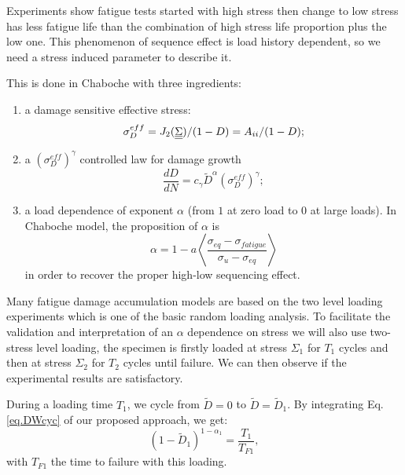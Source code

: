 Experiments show fatigue tests started with high stress then change to low stress has less fatigue life than the combination of high stress life proportion plus the low one. This phenomenon of sequence effect is load history dependent, so we need a stress induced parameter to describe it. 

This is done in Chaboche  with three ingredients:

\begin{enumerate} 
\vspace{6pt}
\item a damage sensitive effective stress: 
$$\sigma_D^{eff} = J_2(\uline{\uline{\Sigma}})/(1-D)={A}_{\uppercase\expandafter{\romannumeral2}}/(1-D);$$

\vspace{6pt}

\item a $(\sigma_D^{eff})^\gamma$ controlled  law for damage growth
$$\dfrac{dD}{dN} =c_\gamma {\tilde{D}}^\alpha (\sigma_D^{eff})^\gamma;$$

\vspace{6pt}

\item  a load dependence of exponent $\alpha$ (from $1$ at zero load to $0$ at large loads). In Chaboche model, the proposition of $\alpha$ is
\begin{equation}
\alpha = 1 - a\left\langle \frac{ \sigma_{eq}-\sigma_{fatigue}}{ \sigma_{u} - \sigma_{eq}}\right\rangle
\label{eq.alpchaboche}
\end{equation}
in order to recover the proper high-low sequencing effect.
\end{enumerate}

Many fatigue damage accumulation models are based on the two level loading experiments which is one of the basic random loading analysis. To facilitate the validation and interpretation of an $\alpha$ dependence on stress we will also use two-stress level loading, the specimen is firstly loaded at stress $\Sigma_1$ for $T_1$ cycles and then at stress $\Sigma_2$ for $T_2$ cycles until failure. We can then observe if the experimental results are satisfactory.

During a loading time $T_1$, we  cycle  from $\tilde{D}=0$ to $\tilde{D}= \tilde{D}_1$. By integrating Eq.\eqref{eq.DWcyc} of our proposed approach, we get:
\begin{equation}
\left( 1-\tilde{D}_1\right) ^{1-\alpha_1}=\dfrac{T_1}{T_{F1}},
\label{23a}
\end{equation}
with $T_{F1}$ the time to failure with this loading.

